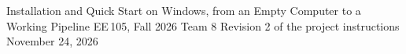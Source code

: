 \documentclass[11pt,letterpaper]{article}
\begin{document}
\thispagestyle{plain}
%
  {Installation and Quick Start on Windows, from an Empty Computer to a Working Pipeline}%
  {EE\,105, Fall 2026 \textperiodcentered{} Team 8 \textperiodcentered{} Revision 2 of the project instructions}%
  {November 24, 2026}


\tableofcontents
\clearpage










\appendix

\end{document}
